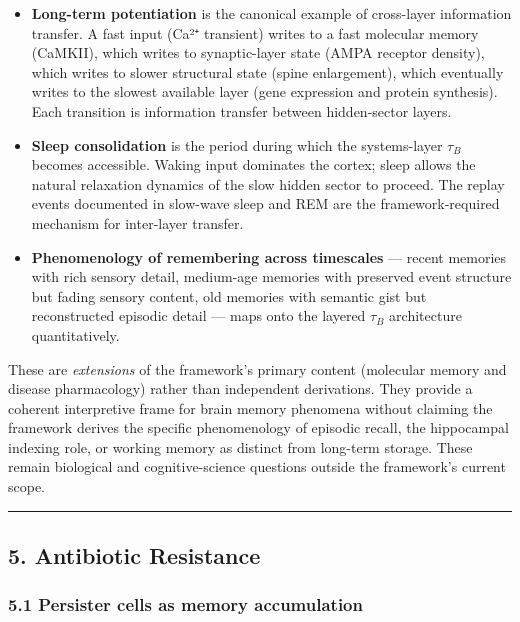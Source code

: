 \documentclass[
]{article}
\providecommand{\tightlist}{%
  \setlength{\itemsep}{0pt}\setlength{\parskip}{0pt}}
\begin{document}
\begin{itemize}
\tightlist
\item
  \textbf{Long-term potentiation} is the canonical example of
  cross-layer information transfer. A fast input (Ca²⁺ transient) writes
  to a fast molecular memory (CaMKII), which writes to synaptic-layer
  state (AMPA receptor density), which writes to slower structural state
  (spine enlargement), which eventually writes to the slowest available
  layer (gene expression and protein synthesis). Each transition is
  information transfer between hidden-sector layers.
\item
  \textbf{Sleep consolidation} is the period during which the
  systems-layer \(\tau_B\) becomes accessible. Waking input dominates
  the cortex; sleep allows the natural relaxation dynamics of the slow
  hidden sector to proceed. The replay events documented in slow-wave
  sleep and REM are the framework-required mechanism for inter-layer
  transfer.
\item
  \textbf{Phenomenology of remembering across timescales} --- recent
  memories with rich sensory detail, medium-age memories with preserved
  event structure but fading sensory content, old memories with semantic
  gist but reconstructed episodic detail --- maps onto the layered
  \(\tau_B\) architecture quantitatively.
\end{itemize}

These are \emph{extensions} of the framework's primary content
(molecular memory and disease pharmacology) rather than independent
derivations. They provide a coherent interpretive frame for brain memory
phenomena without claiming the framework derives the specific
phenomenology of episodic recall, the hippocampal indexing role, or
working memory as distinct from long-term storage. These remain
biological and cognitive-science questions outside the framework's
current scope.

\begin{center}\rule{0.5\linewidth}{0.5pt}\end{center}

\hypertarget{antibiotic-resistance}{%
\subsection{5. Antibiotic Resistance}\label{antibiotic-resistance}}

\hypertarget{persister-cells-as-memory-accumulation}{%
\subsubsection{5.1 Persister cells as memory
accumulation}\label{persister-cells-as-memory-accumulation}}
\end{document}
